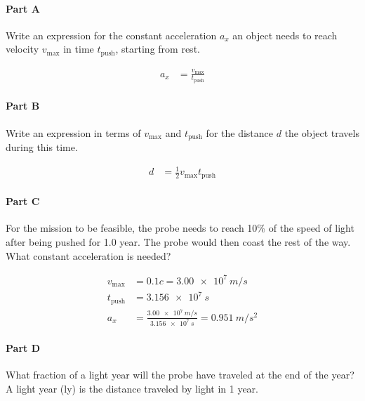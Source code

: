 \paragraph{Part A}
Write an expression for the constant acceleration $a_x$ an object needs to reach velocity $v_{\mathrm{max}}$ in time $t_{\mathrm{push}}$, starting from rest.

\begin{solution}
	\begin{align*}
		a_x &= \frac{v_{\mathrm{max}}}{t_{\mathrm{push}}}
	\end{align*}
\end{solution}

\paragraph{Part B}
Write an expression in terms of $v_{\mathrm{max}}$ and $t_{\mathrm{push}}$ for the distance $d$ the object travels during this time.

\begin{solution}
	\begin{align*}
		d &= \frac{1}{2} v_{\mathrm{max}} t_{\mathrm{push}}
	\end{align*}
\end{solution}

\paragraph{Part C}
For the mission to be feasible, the probe needs to reach 10\% of the speed of light after being pushed for 1.0 year. The probe would then coast the rest of the way. What constant acceleration is needed?

\begin{solution}
	\begin{align*}
		v_{\mathrm{max}} &= 0.1c = \SI{3.00e7}{m/s} \\
		t_{\mathrm{push}} &= \SI{3.156e7}{s} \\
		a_x &= \frac{\SI{3.00e7}{m/s}}{\SI{3.156e7}{s}} = \SI{0.951}{m/s^2}
	\end{align*}
\end{solution}

\paragraph{Part D}
What fraction of a light year will the probe have traveled at the end of the year? A light year (ly) is the distance traveled by light in 1 year.

